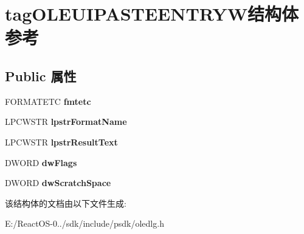 \hypertarget{structtag_o_l_e_u_i_p_a_s_t_e_e_n_t_r_y_w}{}\section{tag\+O\+L\+E\+U\+I\+P\+A\+S\+T\+E\+E\+N\+T\+R\+Y\+W结构体 参考}
\label{structtag_o_l_e_u_i_p_a_s_t_e_e_n_t_r_y_w}
\subsection*{Public 属性}
\begin{DoxyCompactItemize}
\item 
\mbox{\label{structtag_o_l_e_u_i_p_a_s_t_e_e_n_t_r_y_w_a11964f0b92ec80ba72797cdfb720807c}} 
F\+O\+R\+M\+A\+T\+E\+TC {\bfseries fmtetc}
\item 
\mbox{\label{structtag_o_l_e_u_i_p_a_s_t_e_e_n_t_r_y_w_a56a6b1e0ff9854f28ca2ee5d590da9fa}} 
L\+P\+C\+W\+S\+TR {\bfseries lpstr\+Format\+Name}
\item 
\mbox{\label{structtag_o_l_e_u_i_p_a_s_t_e_e_n_t_r_y_w_aaf791f374a4b1f8a9bd9d42232cf006a}} 
L\+P\+C\+W\+S\+TR {\bfseries lpstr\+Result\+Text}
\item 
\mbox{\label{structtag_o_l_e_u_i_p_a_s_t_e_e_n_t_r_y_w_afa32d6e785060a9ab0da46448e1f3ecf}} 
D\+W\+O\+RD {\bfseries dw\+Flags}
\item 
\mbox{\label{structtag_o_l_e_u_i_p_a_s_t_e_e_n_t_r_y_w_affb555eaf003f1dadc0e0473b3b3ac5b}} 
D\+W\+O\+RD {\bfseries dw\+Scratch\+Space}
\end{DoxyCompactItemize}


该结构体的文档由以下文件生成\+:\begin{DoxyCompactItemize}
\item 
E\+:/\+React\+O\+S-\/0../sdk/include/psdk/oledlg.\+h\end{DoxyCompactItemize}
